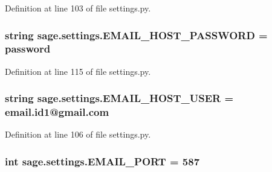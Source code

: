 Definition at line 103 of file settings.\+py.

\hypertarget{namespacesage_1_1settings_a66e7a16ed6b0df5716a6579fcba949a6}{}
\subsubsection[{E\+M\+A\+I\+L\+\_\+\+H\+O\+S\+T\+\_\+\+P\+A\+S\+S\+W\+O\+R\+D}]{\setlength{\rightskip}{0pt plus 5cm}string sage.\+settings.\+E\+M\+A\+I\+L\+\_\+\+H\+O\+S\+T\+\_\+\+P\+A\+S\+S\+W\+O\+R\+D = \textquotesingle{}password\textquotesingle{}}\label{namespacesage_1_1settings_a66e7a16ed6b0df5716a6579fcba949a6}


Definition at line 115 of file settings.\+py.

\hypertarget{namespacesage_1_1settings_a9c01855359753a3c3f517341806347c2}{}
\subsubsection[{E\+M\+A\+I\+L\+\_\+\+H\+O\+S\+T\+\_\+\+U\+S\+E\+R}]{\setlength{\rightskip}{0pt plus 5cm}string sage.\+settings.\+E\+M\+A\+I\+L\+\_\+\+H\+O\+S\+T\+\_\+\+U\+S\+E\+R = \textquotesingle{}email.\+id1@gmail.\+com\textquotesingle{}}\label{namespacesage_1_1settings_a9c01855359753a3c3f517341806347c2}


Definition at line 106 of file settings.\+py.

\hypertarget{namespacesage_1_1settings_a3fe927460bba6408b5df39fa8a10d367}{}
\subsubsection[{E\+M\+A\+I\+L\+\_\+\+P\+O\+R\+T}]{\setlength{\rightskip}{0pt plus 5cm}int sage.\+settings.\+E\+M\+A\+I\+L\+\_\+\+P\+O\+R\+T = 587}\label{namespacesage_1_1settings_a3fe927460bba6408b5df39fa8a10d367}



